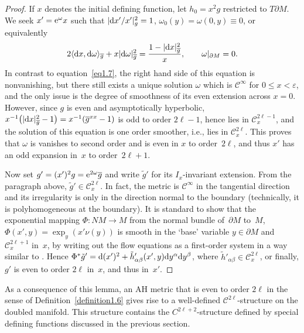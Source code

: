 \documentclass[pdftex]{sigma}
\numberwithin{equation}{section}
\renewcommand{\epsilon}{\varepsilon}
\newcommand{\del}{\partial}
\newcommand{\olg}{\overline{g}}
\newcommand{\calC}{\mathcal C}
\begin{document}
\begin{proof}If $x$ denotes the initial defining function, let $h_0 = x^2 g$ restricted to $T\del M$. We seek $x' = {\rm e}^{\omega} x$ such that $ |{\rm d}x'/x'|^2_g = 1$, $\omega_0(y) = \omega(0,y) \equiv 0$, or equivalently
\begin{gather*} %
2 \langle {\rm d}x, {\rm d}\omega\rangle_{\olg} + x |{\rm d}\omega|^2_{\olg} = \frac{1 - |{\rm d}x|^2_{\olg}}{x}, \qquad \omega |_{\del M} = 0.
\end{gather*}
In contrast to equation~\eqref{eq1.7}, the right hand side of this equation is nonvanishing, but there still exists a unique solution $\omega$ which is $\calC^\infty$ for $0 \leq x < \epsilon$, and the only issue is the degree of smoothness of its even extension across $x=0$. However, since $g$ is even and asymptotically hyperbolic, $ x^{-1}\big(|{\rm d}x|^2_{\olg} - 1\big) = x^{-1} (\olg^{xx} - 1)$ is odd to order $2\ell-1$, hence lies in $\calC^{2\ell-1}_x$, and the solution of this equation is one order smoother, i.e., lies in $\calC^{2\ell}_x$. This proves that $\omega$ is vanishes to second order and is even in $x$ to order~$2\ell$, and thus $x'$ has an odd expansion in~$x$ to order~$2 \ell+1$.

Now set $g' = (x')^2 g = {\rm e}^{2\omega} \olg$ and write $\tilde{g}'$ for its $I_x$-invariant extension. From the paragraph above, $\tilde{g}' \in \calC^{2\ell}_x$. In fact, the metric is $\calC^\infty$ in the tangential direction and its irregularity is only in the direction normal to the boundary (technically, it is polyhomogeneous at the boundary). It is standard to show that the exponential mapping $\Phi\colon NM \to M$ from the normal bundle of~$\del M$ to~$M$, $\Phi(x',y) = \exp_y( x' \nu(y))$ is smooth in the `base' variable $y \in \del M$ and $\calC^{2\ell+1}_x$ in~$x$, by writing out the flow equations as a first-order system in a way similar to \cite[p.~6]{Guillarmou}. Hence $\Phi^*\tilde{g}' = {\rm d}(x')^2 + \tilde{h}'_{\alpha \beta}(x',y) {\rm d}y^\alpha {\rm d}y^\beta$, where $\tilde{h}'_{\alpha \beta} \in \calC^{2\ell}_x$, or finally, $g'$ is even to order $2\ell$ in~$x$, and thus in~$x'$.
\end{proof}

As a consequence of this lemma, an AH metric that is even to order $2\ell$ in the sense of Definition~\ref{definition1.6} gives rise to a well-defined $\calC^{2\ell}$-structure on the doubled manifold. This structure contains the $C^{2\ell+2}$-structure defined by special defining functions discussed in the previous section.
\end{document}
